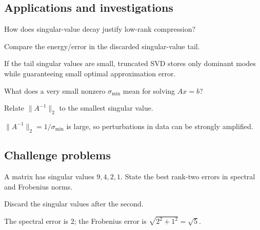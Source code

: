 \subsection*{Applications and investigations}

\begin{exercise}\label{exr:i18-expand-13}
How does singular-value decay justify low-rank compression?
\end{exercise}
\begin{hint}
Compare the energy/error in the discarded singular-value tail.
\end{hint}
\begin{solution}
If the tail singular values are small, truncated SVD stores only dominant modes while guaranteeing small optimal approximation error.
\end{solution}

\begin{exercise}\label{exr:i18-expand-14}
What does a very small nonzero \(\sigma_{\min}\) mean for solving \(Ax=b\)?
\end{exercise}
\begin{hint}
Relate \(\|A^{-1}\|_2\) to the smallest singular value.
\end{hint}
\begin{solution}
\(\|A^{-1}\|_2=1/\sigma_{\min}\) is large, so perturbations in data can be strongly amplified.
\end{solution}

\subsection*{Challenge problems}

\begin{exercise}\label{exr:i18-expand-15}
A matrix has singular values \(9,4,2,1\). State the best rank-two errors in spectral and Frobenius norms.
\end{exercise}
\begin{hint}
Discard the singular values after the second.
\end{hint}
\begin{solution}
The spectral error is \(2\); the Frobenius error is \(\sqrt{2^2+1^2}=\sqrt5\).
\end{solution}

